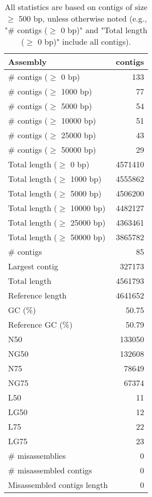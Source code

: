 \documentclass[12pt,a4paper]{article}
\begin{document}
\begin{table}[ht]
\begin{center}
\caption{All statistics are based on contigs of size $\geq$ 500 bp, unless otherwise noted (e.g., "\# contigs ($\geq$ 0 bp)" and "Total length ($\geq$ 0 bp)" include all contigs).}
\begin{tabular}{|l*{1}{|r}|}
\hline
Assembly & contigs \\ \hline
\# contigs ($\geq$ 0 bp) & 133 \\ \hline
\# contigs ($\geq$ 1000 bp) & 77 \\ \hline
\# contigs ($\geq$ 5000 bp) & 54 \\ \hline
\# contigs ($\geq$ 10000 bp) & 51 \\ \hline
\# contigs ($\geq$ 25000 bp) & 43 \\ \hline
\# contigs ($\geq$ 50000 bp) & 29 \\ \hline
Total length ($\geq$ 0 bp) & 4571410 \\ \hline
Total length ($\geq$ 1000 bp) & 4555862 \\ \hline
Total length ($\geq$ 5000 bp) & 4506200 \\ \hline
Total length ($\geq$ 10000 bp) & 4482127 \\ \hline
Total length ($\geq$ 25000 bp) & 4363461 \\ \hline
Total length ($\geq$ 50000 bp) & 3865782 \\ \hline
\# contigs & 85 \\ \hline
Largest contig & 327173 \\ \hline
Total length & 4561793 \\ \hline
Reference length & 4641652 \\ \hline
GC (\%) & 50.75 \\ \hline
Reference GC (\%) & 50.79 \\ \hline
N50 & 133050 \\ \hline
NG50 & 132608 \\ \hline
N75 & 78649 \\ \hline
NG75 & 67374 \\ \hline
L50 & 11 \\ \hline
LG50 & 12 \\ \hline
L75 & 22 \\ \hline
LG75 & 23 \\ \hline
\# misassemblies & 0 \\ \hline
\# misassembled contigs & 0 \\ \hline
Misassembled contigs length & 0 \\ \hline

\end{tabular}
\end{center}
\end{table}
\end{document}
